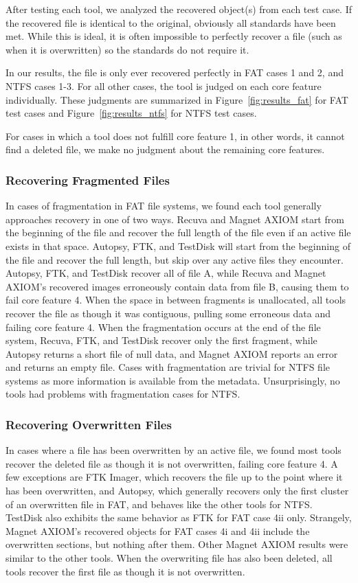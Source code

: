 After testing each tool, we analyzed the recovered object(s) from each test case. 
If the recovered file is identical to the original, obviously all standards have been met. 
While this is ideal, it is often impossible to perfectly recover a file (such as when it is overwritten) so the standards do not require it. 

In our results, the file is only ever recovered perfectly in FAT cases 1 and 2, and NTFS cases 1-3. 
For all other cases, the tool is judged on each core feature individually. 
These judgments are summarized in Figure~\ref{fig:results_fat} for FAT test cases and Figure~\ref{fig:results_ntfs} for NTFS test cases.



For cases in which a tool does not fulfill core feature 1, in other words, it cannot find a deleted file, we make no judgment about the remaining core features.

\subsubsection{Recovering Fragmented Files}
In cases of fragmentation in FAT file systems, we found each tool generally approaches recovery in one of two ways. 
Recuva and Magnet AXIOM start from the beginning of the file and recover the full length of the file even if an active file exists in that space. 
Autopsy, FTK, and TestDisk will start from the beginning of the file and recover the full length, but skip over any active files they encounter.
Autopsy, FTK, and TestDisk recover all of file A, while Recuva and Magnet AXIOM's recovered images erroneously contain data from file B, causing them to fail core feature 4. 
When the space in between fragments is unallocated, all tools recover the file as though it was contiguous, pulling some erroneous data and failing core feature 4. 
When the fragmentation occurs at the end of the file system, Recuva, FTK, and TestDisk recover only the first fragment, while Autopsy returns a short file of null data, and Magnet AXIOM reports an error and returns an empty file.
Cases with fragmentation are trivial for NTFS file systems as more information is available from the metadata. 
Unsurprisingly, no tools had problems with fragmentation cases for NTFS.

\subsubsection{Recovering Overwritten Files}
In cases where a file has been overwritten by an active file, we found most tools recover the deleted file as though it is not overwritten, failing core feature 4. 
A few exceptions are FTK Imager, which recovers the file up to the point where it has been overwritten, and Autopsy, which generally recovers only the first cluster of an overwritten file in FAT, and behaves like the other tools for NTFS. 
TestDisk also exhibits the same behavior as FTK for FAT case 4ii only. 
Strangely, Magnet AXIOM's recovered objects for FAT cases 4i and 4ii include the overwritten sections, but nothing after them.
Other Magnet AXIOM results were similar to the other tools.
When the overwriting file has also been deleted, all tools recover the first file as though it is not overwritten.

